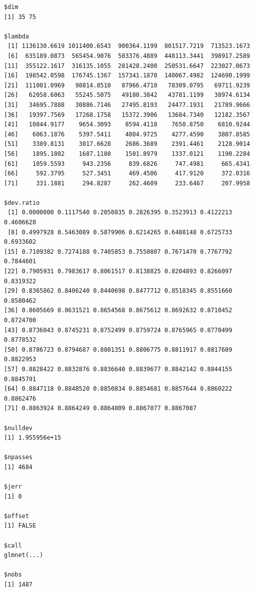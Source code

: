 \documentclass[
]{article}
\begin{document}
\begin{verbatim}
$dim
[1] 35 75

$lambda
 [1] 1136130.6619 1011400.6543  900364.1199  801517.7219  713523.1673
 [6]  635189.0873  565454.9076  503376.4889  448113.3441  398917.2589
[11]  355122.1617  316135.1055  281428.2400  250531.6647  223027.0673
[16]  198542.0598  176745.1367  157341.1870  140067.4982  124690.1999
[21]  111001.0969   98814.8510   87966.4710   78309.0795   69711.9239
[26]   62058.6063   55245.5075   49180.3842   43781.1199   38974.6134
[31]   34695.7888   30886.7146   27495.8193   24477.1931   21789.9666
[36]   19397.7569   17268.1758   15372.3906   13684.7340   12182.3567
[41]   10844.9177    9654.3093    8594.4118    7650.8750    6810.9244
[46]    6063.1876    5397.5411    4804.9725    4277.4590    3807.8585
[51]    3389.8131    3017.6628    2686.3689    2391.4461    2128.9014
[56]    1895.1802    1687.1180    1501.8979    1337.0121    1190.2284
[61]    1059.5593     943.2356     839.6826     747.4981     665.4341
[66]     592.3795     527.3451     469.4506     417.9120     372.0316
[71]     331.1881     294.8287     262.4609     233.6467     207.9958

$dev.ratio
 [1] 0.0000000 0.1117540 0.2050835 0.2826395 0.3523913 0.4122213 0.4606628
 [8] 0.4997928 0.5463089 0.5879906 0.6214265 0.6488148 0.6725733 0.6933602
[15] 0.7109382 0.7274188 0.7405853 0.7550807 0.7671470 0.7767792 0.7844601
[22] 0.7905931 0.7983617 0.8061517 0.8138825 0.8204893 0.8266097 0.8319322
[29] 0.8365862 0.8406240 0.8440698 0.8477712 0.8518345 0.8551660 0.8580462
[36] 0.8605669 0.8631521 0.8654568 0.8675612 0.8692632 0.8710452 0.8724700
[43] 0.8736043 0.8745231 0.8752499 0.8759724 0.8765965 0.8770499 0.8778532
[50] 0.8786723 0.8794687 0.8801351 0.8806775 0.8811917 0.8817689 0.8822953
[57] 0.8828422 0.8832876 0.8836640 0.8839677 0.8842142 0.8844155 0.8845791
[64] 0.8847118 0.8848520 0.8850834 0.8854681 0.8857644 0.8860222 0.8862476
[71] 0.8863924 0.8864249 0.8864809 0.8867077 0.8867087

$nulldev
[1] 1.955956e+15

$npasses
[1] 4684

$jerr
[1] 0

$offset
[1] FALSE

$call
glmnet(...)

$nobs
[1] 1487


\end{verbatim}
\end{document}

